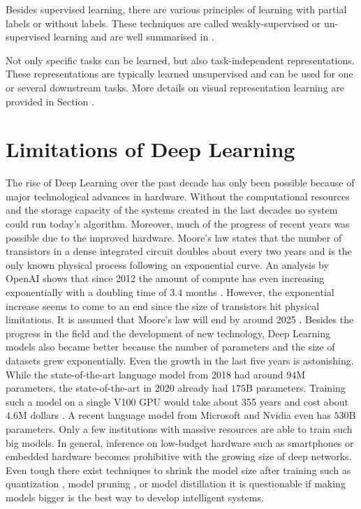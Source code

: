 Besides supervised learning, there are various principles of learning with partial labels or without labels.
These techniques are called weakly-supervised or un-supervised learning and are well summarised in .

Not only specific tasks can be learned, but also task-independent representations.
These representations are typically learned unsupervised and can be used for one or several downstream tasks.
More details on visual representation learning are provided in Section .


\section{Limitations of Deep Learning}
The rise of Deep Learning over the past decade has only been possible because of major technological advances in hardware.
Without the computational resources and the storage capacity of the systems created in the last decades no system could run today's algorithm.
Moreover, much of the progress of recent years was possible due to the improved hardware. 
Moore’s law \cite{Moore_2006} states that the number of transistors in a dense integrated circuit doubles about every two years and is the only known physical process following an exponential curve.
An analysis by OpenAI shows that since 2012 the amount of compute has even increasing exponentially with a doubling time  of \(3.4\) months \cite{OpenAI_compute}.
However, the exponential increase seems to come to an end since the size of transistors hit physical limitations.
It is assumed that Moore's law will end by around 2025 .
Besides the progress in the field and the development of new technology, Deep Learning models also became better because the number of parameters and the size of datasets grew exponentially.
Even the growth in the last five years is astonishing.
While the state-of-the-art language model from 2018  had around \(94\)M parameters, the state-of-the-art in 2020  already had \(175\)B parameters. Training such a model on a single V100 GPU would take about 355 years and cost about \(4.6\)M dollars \cite{Lambda_GPT3}.
A recent language model from Microsoft and Nvidia  even has \(530\)B parameters.
Only a few institutions with massive resources are able to train such big models.
In general, inference on low-budget hardware such as smartphones or embedded hardware becomes prohibitive with the growing size of deep networks.
Even tough there exist techniques to shrink the model size after training such as quantization \cite{Wu_Judd_Zhang_Isaev_Micikevicius_2020}, model pruning \cite{Choudhary_Mishra_Goswami_Sarangapani_2020}, or model distillation \cite{Hinton_Vinyals_Dean_2015} it is questionable if making models bigger is the best way to develop intelligent systems.

